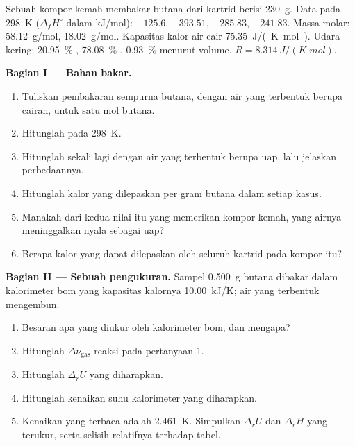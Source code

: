\begin{problem}
\label{pb:b2:reaction-enthalpy:1}
Sebuah kompor kemah membakar butana dari kartrid berisi \qty{230}{g}.
Data pada \qty{298}{K} ($\Delta_f H^\circ$ dalam \unit{kJ/mol}):
 $-125.6$,  $-393.51$,  $-285.83$,
 $-241.83$. Massa molar:  \qty{58.12}{g/mol},
 \qty{18.02}{g/mol}. Kapasitas kalor air cair
\qty{75.35}{J/(K.mol)}. Udara kering: \qty{20.95}{\percent} ,
\qty{78.08}{\percent} , \qty{0.93}{\percent}  menurut
volume. $R = \qty{8.314}{J/(K.mol)}$.

\medskip
\noindent\textbf{Bagian I --- Bahan bakar.}
\begin{enumerate}
  \item Tuliskan pembakaran sempurna butana, dengan air yang terbentuk
        berupa cairan, untuk satu mol butana.
  \item Hitunglah  pada \qty{298}{K}.
  \item Hitunglah sekali lagi dengan air yang terbentuk berupa uap, lalu
        jelaskan perbedaannya.
  \item Hitunglah kalor yang dilepaskan per gram butana dalam setiap kasus.
  \item Manakah dari kedua nilai itu yang memerikan kompor kemah, yang
        airnya meninggalkan nyala sebagai uap?
  \item Berapa kalor yang dapat dilepaskan oleh seluruh kartrid pada
        kompor itu?
\end{enumerate}

\medskip
\noindent\textbf{Bagian II --- Sebuah pengukuran.}
Sampel \qty{0.500}{g} butana dibakar dalam kalorimeter bom yang kapasitas
kalornya \qty{10.00}{kJ/K}; air yang terbentuk mengembun.
\begin{enumerate}[resume]
  \item Besaran apa yang diukur oleh kalorimeter bom, dan mengapa?
  \item Hitunglah $\Delta\nu_{\text{gas}}$ reaksi pada pertanyaan 1.
  \item Hitunglah $\Delta_r U$ yang diharapkan.
  \item Hitunglah kenaikan suhu kalorimeter yang diharapkan.
  \item Kenaikan yang terbaca adalah \qty{2.461}{K}. Simpulkan
        $\Delta_r U$ dan $\Delta_r H$ yang terukur, serta selisih relatifnya
        terhadap tabel.
\end{enumerate}


\end{problem}

